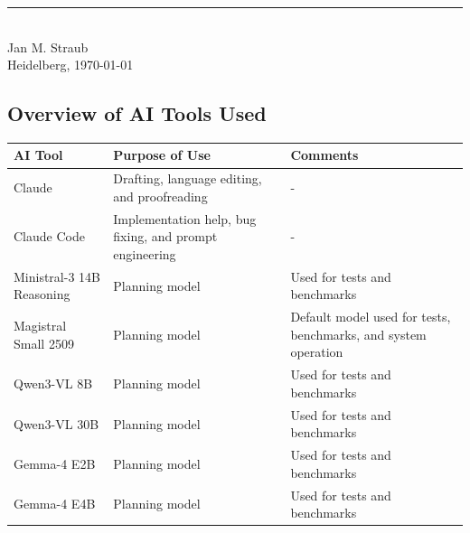 \documentclass[
     12pt,
     a4paper,
     BCOR=10mm,
     DIV=14,
     listof=totoc,
     bibliography=totoc,
     parskip,
     twoside,
     headsepline
     ]{scrreprt}
\begin{document}
\vspace{1.5em}

\begin{flushright}
	\begin{minipage}{20em}
		\rule{\textwidth}{0.5pt}\\
		Jan M. Straub \\
		Heidelberg, \today
	\end{minipage}
\end{flushright}

\clearpage

\vspace*{30pt}

\subsection*{Overview of AI Tools Used}

\begin{tabularx}{\textwidth}{>{\raggedright\arraybackslash}X >{\raggedright\arraybackslash}X >{\raggedright\arraybackslash}X}
	\toprule
	\textbf{AI Tool}          & \textbf{Purpose of Use}                                 & \textbf{Comments}                                              \\
	\midrule
	Claude                    & Drafting, language editing, and proofreading            & -                                                              \\
	Claude Code               & Implementation help, bug fixing, and prompt engineering & -                                                              \\
	Ministral-3 14B Reasoning & Planning model                                          & Used for tests and benchmarks                                  \\
	Magistral Small 2509      & Planning model                                          & Default model used for tests, benchmarks, and system operation \\
	Qwen3-VL 8B               & Planning model                                          & Used for tests and benchmarks                                  \\
	Qwen3-VL 30B              & Planning model                                          & Used for tests and benchmarks                                  \\
	Gemma-4 E2B               & Planning model                                          & Used for tests and benchmarks                                  \\
	Gemma-4 E4B               & Planning model                                          & Used for tests and benchmarks                                  \\
	\bottomrule
\end{tabularx}
\end{document}
